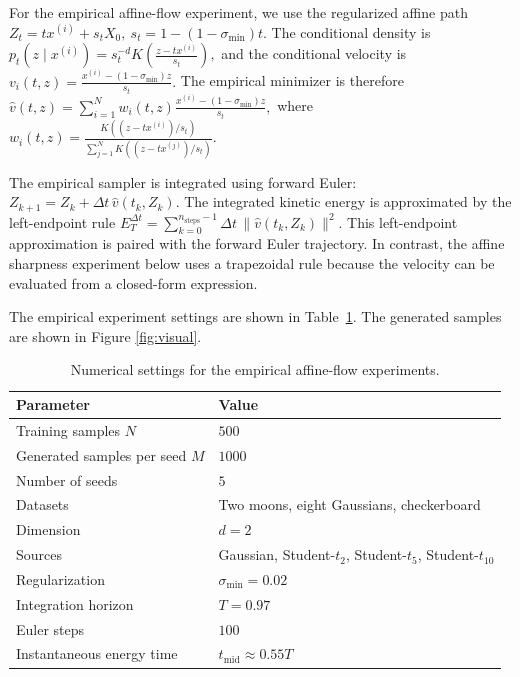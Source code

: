 \documentclass[a4paper,11pt]{article}
\theoremstyle{plain}
\theoremstyle{definition}
\begin{document}
For the empirical affine-flow experiment, we use the regularized affine path
\(
    Z_t=t x^{(i)} + s_t X_0,
    \ 
    s_t=1-(1-\sigma_{\min})t.
\)
The conditional density is
\(
    p_t(z\mid x^{(i)})
    =
    s_t^{-d}
    K\!\left(\frac{z-tx^{(i)}}{s_t}\right),
\)
and the conditional velocity is
\(
    v_i(t,z)
    =
    \frac{x^{(i)}-(1-\sigma_{\min})z}{s_t}.
\)
The empirical minimizer is therefore
\(
    \hat v(t,z)
    =
    \sum_{i=1}^N w_i(t,z)
    \frac{x^{(i)}-(1-\sigma_{\min})z}{s_t},
\)
where
\(
    w_i(t,z)
    =
    \frac{
    K\!\left((z-tx^{(i)})/s_t\right)
    }{
    \sum_{j=1}^N
    K\!\left((z-tx^{(j)})/s_t\right)
    }.
\)

The empirical sampler is integrated using forward Euler:
\(
    Z_{k+1}
    =
    Z_k+\Delta t\,\hat v(t_k,Z_k).
\)
The integrated kinetic energy is approximated by the left-endpoint rule
\(
    E_T^{\Delta t}
    =
    \sum_{k=0}^{n_{\mathrm{steps}}-1}
    \Delta t\,
    \|\hat v(t_k,Z_k)\|^2.
\)
This left-endpoint approximation is paired with the forward Euler trajectory. In contrast, the
affine sharpness experiment below uses a trapezoidal rule because the velocity can be evaluated
from a closed-form expression.

The empirical experiment settings are shown in Table~\ref{tab:empirical_numerics_settings}. The generated samples are shown in Figure \ref{fig:visual}.

\begin{table}[!h]
\centering
\small 
\begin{tabular}{ll}
\toprule
Parameter & Value \\
\midrule
Training samples \(N\) & \(500\) \\
Generated samples per seed \(M\) & \(1000\) \\
Number of seeds & \(5\) \\
Datasets & Two moons, eight Gaussians, checkerboard \\
Dimension & \(d=2\) \\
Sources & Gaussian, Student-\(t_2\), Student-\(t_5\), Student-\(t_{10}\) \\
Regularization & \(\sigma_{\min}=0.02\) \\
Integration horizon & \(T=0.97\) \\
Euler steps & \(100\) \\
Instantaneous energy time & \(t_{\mathrm{mid}}\approx0.55T\) \\
\bottomrule
\end{tabular}
\caption{Numerical settings for the empirical affine-flow experiments.}
\label{tab:empirical_numerics_settings}
\end{table}
\end{document}
